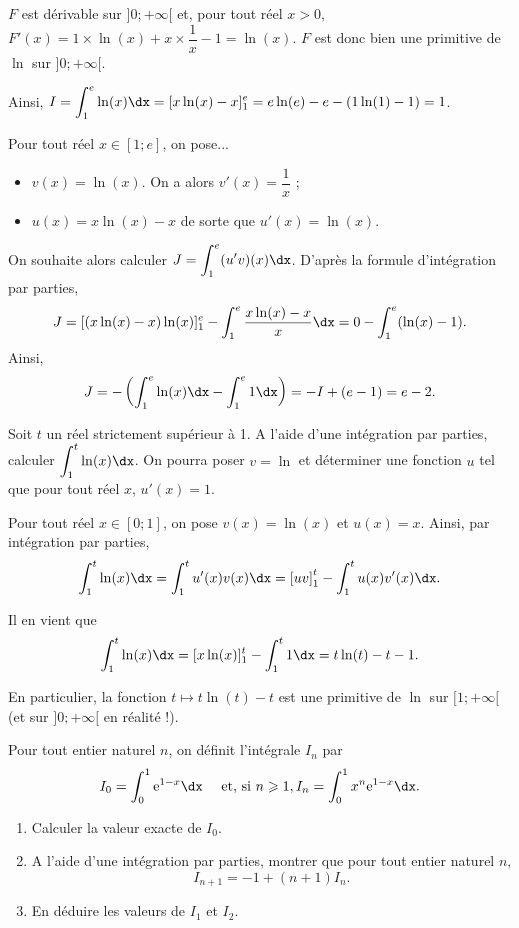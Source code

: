 \documentclass[11pt,fleqn, openany]{book} %
\begin{document}
\begin{solution}$F$ est dérivable sur $]0;+\infty[$ et, pour tout réel $x>0$, $F'(x)=1\times \ln(x)+x \times \dfrac{1}{x} - 1 = \ln(x)$. $F$ est donc bien une primitive de $\ln$ sur $]0;+\infty[$.

Ainsi, $I=\displaystyle\int_1^e \ln(x)\dx = [x\ln(x)-x]_1^e = e\ln(e) - e -(1\ln(1)-1) = 1$.

Pour tout réel \(x\in[1;e]\), on pose...
\begin{itemize}
\item  \(v(x)=\ln(x)\). On a alors \(v'(x)=\dfrac{1}{x}\) ;
\item  \(u(x)=x\ln(x)-x\) de sorte que \(u'(x)=\ln(x)\).
\end{itemize}

On souhaite alors calculer \(J=\displaystyle\int_{1}^e (u'v)(x)\dx\). D'après la formule d'intégration par parties,
\[ J = [(x\ln(x)-x)\ln(x)]_1^e - \displaystyle\int_1^e \dfrac{x\ln(x)-x}{x}\dx = 0 - \displaystyle\int_1^e(\ln(x)-1).\]
Ainsi,
\[J=-\left(\displaystyle\int_1^e\ln(x)\dx-\displaystyle\int_1^e 1\dx\right) = -I+(e-1)=e-2.\]
\end{solution}



\begin{exercise}
Soit $t$ un réel strictement supérieur à 1. A l'aide d'une intégration par parties, calculer $\displaystyle\int_{1}^t \ln(x)\dx$. On pourra poser $v=\ln$ et déterminer une fonction $u$ tel que pour tout réel $x$, $u'(x)=1$.\end{exercise}

\begin{solution}
	Pour tout réel \(x \in [0;1]\), on pose \(v(x)=\ln(x)\) et \(u(x)=x\). Ainsi, par intégration par parties,
	\[\displaystyle\int_{1}^t \ln(x)\dx = \displaystyle\int_{1}^t u'(x)v(x)\dx = \left[uv\right]_1^t-\displaystyle\int_{1}^t u(x)v'(x)\dx.\]

	Il en vient que 
	\[\displaystyle\int_{1}^t \ln(x)\dx = [x\ln(x)]_1^t-\displaystyle\int_{1}^t 1\dx = t\ln(t)-t-1.\]

	En particulier, la fonction \(t \mapsto t\ln(t)-t\) est une primitive de \(\ln\) sur \([1;+\infty[\) (et sur \(]0;+\infty[\) en réalité !).

\end{solution}





\begin{exercise}
Pour tout entier naturel $n$, on définit l'intégrale $I_n$ par
\[ I_0=\int_0^1\e^{1-x}\dx \quad \text{ et, si }n \geqslant 1, I_n=\int_0^1x^n\e^{1-x}\dx.\]	
\begin{enumerate}
\item Calculer la valeur exacte de $I_0$.
\item A l'aide d'une intégration par parties, montrer que pour tout entier naturel $n$, \[I_{n+1}=-1+(n+1)I_n.\]
\item En déduire les valeurs de $I_1$ et $I_2$.
\end{enumerate}\end{exercise}
\end{document}
